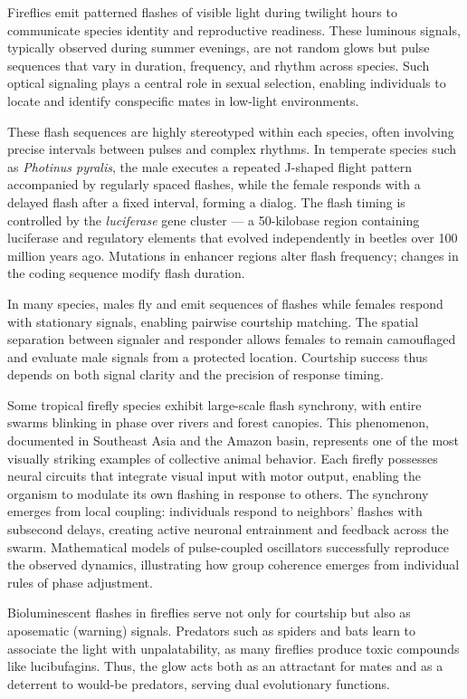 Fireflies emit patterned flashes of visible light during twilight hours to communicate species identity and reproductive readiness. These luminous signals, typically observed during summer evenings, are not random glows but pulse sequences that vary in duration, frequency, and rhythm across species. Such optical signaling plays a central role in sexual selection, enabling individuals to locate and identify conspecific mates in low-light environments.

These flash sequences are highly stereotyped within each species, often involving precise intervals between pulses and complex rhythms. In temperate species such as \emph{Photinus pyralis}, the male executes a repeated J-shaped flight pattern accompanied by regularly spaced flashes, while the female responds with a delayed flash after a fixed interval, forming a dialog. The flash timing is controlled by the \textit{luciferase} gene cluster — a 50-kilobase region containing luciferase and regulatory elements that evolved independently in beetles over 100 million years ago. Mutations in enhancer regions alter flash frequency; changes in the coding sequence modify flash duration.

In many species, males fly and emit sequences of flashes while females respond with stationary signals, enabling pairwise courtship matching. The spatial separation between signaler and responder allows females to remain camouflaged and evaluate male signals from a protected location. Courtship success thus depends on both signal clarity and the precision of response timing.

Some tropical firefly species exhibit large-scale flash synchrony, with entire swarms blinking in phase over rivers and forest canopies. This phenomenon, documented in Southeast Asia and the Amazon basin, represents one of the most visually striking examples of collective animal behavior. Each firefly possesses neural circuits that integrate visual input with motor output, enabling the organism to modulate its own flashing in response to others. The synchrony emerges from local coupling: individuals respond to neighbors' flashes with subsecond delays, creating active neuronal entrainment and feedback across the swarm. Mathematical models of pulse-coupled oscillators successfully reproduce the observed dynamics, illustrating how group coherence emerges from individual rules of phase adjustment.

Bioluminescent flashes in fireflies serve not only for courtship but also as aposematic (warning) signals. Predators such as spiders and bats learn to associate the light with unpalatability, as many fireflies produce toxic compounds like lucibufagins. Thus, the glow acts both as an attractant for mates and as a deterrent to would-be predators, serving dual evolutionary functions.

